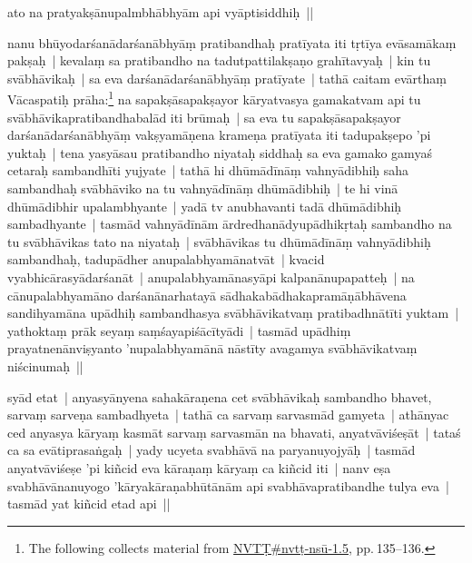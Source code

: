 \documentclass[article,12pt,a4paper]{memoir}
\begin{document}
	  \pstart ato na pratyakṣānupalmbhābhyām api vyāptisiddhiḥ ||
	\pend
      
	  
	

	  \pstart nanu bhūyodarśanādarśanābhyāṃ pratibandhaḥ pratīyata iti tṛtīya evāsamākaṃ pakṣaḥ | kevalaṃ sa pratibandho na tadutpattilakṣaṇo grahītavyaḥ | kin tu svābhāvikaḥ | sa eva darśanādarśanābhyāṃ pratīyate | tathā caitam evārthaṃ Vācaspatiḥ prāha:\footnote{The following collects material from \href{NVTṬ\#nvtṭ-nsū_1-1.5}{NVTṬ\#nvtṭ-nsū-1.5}, pp. 135--136.} na sapakṣāsapakṣayor  kāryatvasya gamakatvam api tu svābhāvikapratibandhabalād iti brūmaḥ | sa eva tu sapakṣāsapakṣayor darśanādarśanābhyāṃ vakṣyamāṇena krameṇa pratīyata iti tadupakṣepo 'pi yuktaḥ | \label{sarit__ratnakīrtinibandhāvali__122689}tena yasyāsau pratibandho niyataḥ siddhaḥ sa eva gamako gamyaś cetaraḥ sambandhīti yujyate | tathā hi dhūmādīnāṃ vahnyādibhiḥ saha sambandhaḥ svābhāviko na tu vahnyādīnāṃ dhūmādibhiḥ | te hi vinā dhūmādibhir upalambhyante | yadā tv  anubhavanti tadā dhūmādibhiḥ sambadhyante | tasmād vahnyādīnām ārdredhanādyupādhikṛtaḥ sambandho na tu svābhāvikas tato na niyataḥ | svābhāvikas tu dhūmādīnāṃ vahnyādibhiḥ sambandhaḥ, tadupādher anupalabhyamānatvāt | kvacid vyabhicārasyādarśanāt | anupalabhyamānasyāpi kalpanānupapatteḥ | na cānupalabhyamāno darśanānarhatayā sādhakabādhakapramāṇābhāvena sandihyamāna upādhiḥ sambandhasya svābhāvikatvaṃ pratibadhnātīti yuktam | yathoktaṃ prāk seyaṃ saṃśayapiśācītyādi | tasmād upādhiṃ prayatnenānviṣyanto 'nupalabhyamānā nāstīty avagamya svābhāvikatvaṃ niścinumaḥ ||
	\pend
      

	  \pstart syād etat | anyasyānyena sahakāraṇena cet svābhāvikaḥ sambandho bhavet, sarvaṃ sarveṇa sambadhyeta | tathā ca sarvaṃ sarvasmād gamyeta | athānyac ced anyasya kāryaṃ kasmāt sarvaṃ sarvasmān na bhavati, anyatvāviśeṣāt | tataś ca sa evātiprasaṅgaḥ | yady ucyeta svabhāvā na paryanuyojyāḥ | tasmād anyatvāviśeṣe 'pi kiñcid eva kāraṇaṃ kāryaṃ ca kiñcid iti | nanv eṣa svabhāvānanuyogo 'kāryakāraṇabhūtānām api svabhāvapratibandhe tulya eva | tasmād yat kiñcid etad api ||\label{sarit__ratnakīrtinibandhāvali__124304}
	\pend
      
\end{document}
